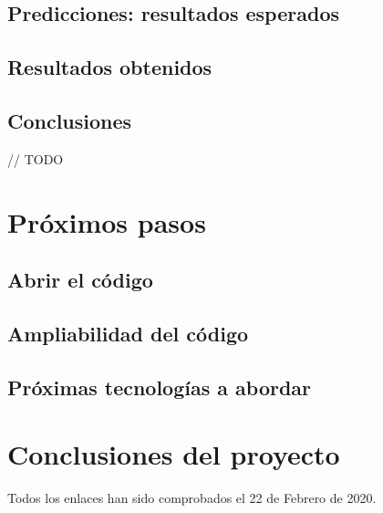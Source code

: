 \documentclass[
  a4paper,  %
  twoside,  %
  bibliography=totoc,
  headsepline,
  cleardoublepage=empty,
  parskip=half,
  draft=false
]{scrbook}
\begin{document}
\section{Predicciones: resultados esperados}


\section{Resultados obtenidos}


\section{Conclusiones}
// TODO

\chapter{Próximos pasos}
\label{chap:further-steps}

\section{Abrir el código}


\section{Ampliabilidad del código}


\section{Próximas tecnologías a abordar}


\chapter{Conclusiones del proyecto}

\printbibliography

Todos los enlaces han sido comprobados el 22 de Febrero de 2020.

% 

\pagestyle{empty}
\renewcommand*{\chapterpagestyle}{empty}
\end{document}
